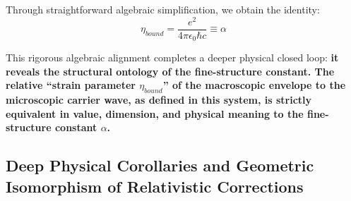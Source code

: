 \documentclass[12pt, a4paper]{article}
\begin{document}
Through straightforward algebraic simplification, we obtain the identity:
\begin{equation}
    \eta_{bound} = \frac{e^2}{4\pi\epsilon_0 \hbar c} \equiv \alpha 
\end{equation}

This rigorous algebraic alignment completes a deeper physical closed loop: \textbf{it reveals the structural ontology of the fine-structure constant. The relative ``strain parameter $\eta_{bound}$'' of the macroscopic envelope to the microscopic carrier wave, as defined in this system, is strictly equivalent in value, dimension, and physical meaning to the fine-structure constant $\alpha$.}

\subsection{Deep Physical Corollaries and Geometric Isomorphism of Relativistic Corrections}
\end{document}
